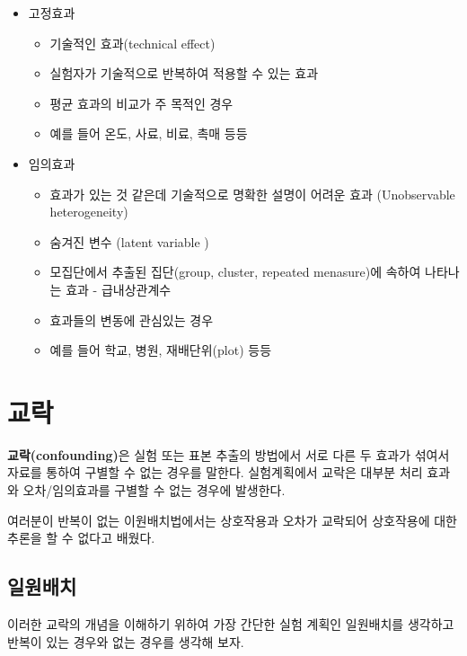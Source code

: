 \documentclass[
]{book}
\providecommand{\tightlist}{%
  \setlength{\itemsep}{0pt}\setlength{\parskip}{0pt}}
\theoremstyle{definition}
\theoremstyle{definition}
\theoremstyle{definition}
\theoremstyle{remark}
\begin{document}
\begin{itemize}
\tightlist
\item
  고정효과

  \begin{itemize}
  \tightlist
  \item
    기술적인 효과(technical effect)
  \item
    실험자가 기술적으로 반복하여 적용할 수 있는 효과
  \item
    평균 효과의 비교가 주 목적인 경우
  \item
    예를 들어 온도, 사료, 비료, 촉매 등등
  \end{itemize}
\item
  임의효과

  \begin{itemize}
  \tightlist
  \item
    효과가 있는 것 같은데 기술적으로 명확한 설명이 어려운 효과 (Unobservable heterogeneity)
  \item
    숨겨진 변수 (latent variable )
  \item
    모집단에서 추출된 집단(group, cluster, repeated menasure)에 속하여 나타나는 효과 - 급내상관계수
  \item
    효과들의 변동에 관심있는 경우
  \item
    예를 들어 학교, 병원, 재배단위(plot) 등등
  \end{itemize}
\end{itemize}

\hypertarget{uxad50uxb77d}{%
\section{교락}\label{uxad50uxb77d}}

\textbf{교락(confounding)}은 실험 또는 표본 추출의 방법에서 서로 다른 두 효과가 섞여서 자료를 통하여 구별할 수 없는 경우를 말한다. 실험계획에서 교락은 대부분 처리 효과와 오차/임의효과를 구별할 수 없는 경우에 발생한다.

여러분이 반복이 없는 이원배치법에서는 상호작용과 오차가 교락되어 상호작용에 대한 추론을 할 수 없다고 배웠다.

\hypertarget{uxc77cuxc6d0uxbc30uxce58}{%
\subsection{일원배치}\label{uxc77cuxc6d0uxbc30uxce58}}

이러한 교락의 개념을 이해하기 위하여 가장 간단한 실험 계획인 일원배치를 생각하고 반복이 있는 경우와 없는 경우를 생각해 보자.
\end{document}
